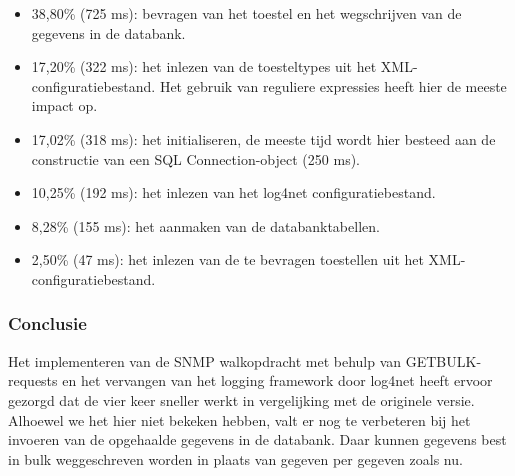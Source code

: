 \begin{itemize}
	\item 38,80\% (725 ms): bevragen van het toestel en het wegschrijven van de gegevens in de databank.
	\item 17,20\% (322 ms): het inlezen van de toesteltypes uit het XML-configuratiebestand.
		Het gebruik van reguliere expressies heeft hier de meeste impact op.
	\item 17,02\% (318 ms): het initialiseren,
		de meeste tijd wordt hier besteed aan de constructie van een SQL Connection-object (250 ms).
	\item 10,25\% (192 ms): het inlezen van het log4net configuratiebestand.
	\item 8,28\% (155 ms): het aanmaken van de databanktabellen.
	\item 2,50\% (47 ms): het inlezen van de te bevragen toestellen uit het XML-configuratiebestand.
\end{itemize}

\subsubsection{Conclusie}

Het implementeren van de SNMP walkopdracht met behulp van GETBULK-requests en het vervangen van het logging framework
door log4net heeft ervoor gezorgd dat de \nwmretriever{} vier keer sneller werkt in vergelijking met de originele versie.
Alhoewel we het hier niet bekeken hebben, valt er nog te verbeteren bij het invoeren van de opgehaalde gegevens in de databank.
Daar kunnen gegevens best in bulk weggeschreven worden in plaats van gegeven per gegeven zoals nu.

